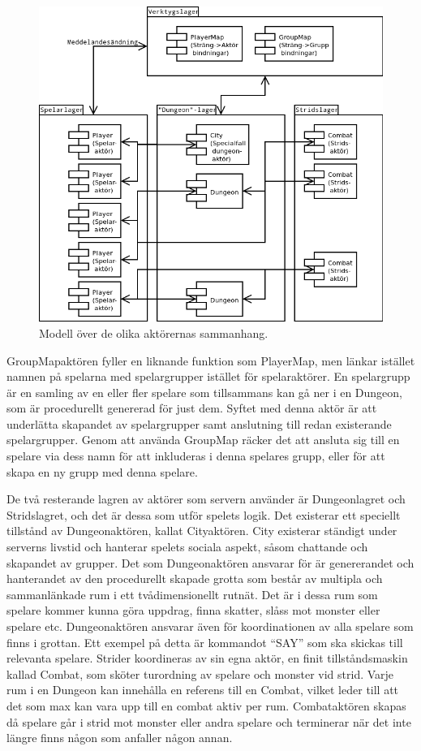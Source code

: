 \documentclass[a4paper]{article}
\begin{document}
\begin{figure}[hbt]
\centering
\includegraphics[width=1.0\textwidth]{serverActorModel2-2}
\caption{\label{fig:ServerActorModel}Modell över de olika aktörernas sammanhang.}
\end{figure}

GroupMapaktören fyller en liknande funktion som PlayerMap, men länkar istället namnen på spelarna med spelargrupper istället för spelaraktörer. 
En spelargrupp är en samling av en eller fler spelare som tillsammans kan gå ner i en Dungeon, som är procedurellt genererad för just dem. Syftet med 
denna aktör är att underlätta skapandet av spelargrupper samt anslutning till redan existerande spelargrupper. Genom att använda GroupMap räcker det att ansluta sig till en 
spelare via dess namn för att inkluderas i denna spelares grupp, eller för att skapa en ny grupp med denna spelare.

De två resterande lagren av aktörer som servern använder är Dungeonlagret och Stridslagret, och det är dessa som utför spelets logik. 
Det existerar ett speciellt tillstånd av Dungeonaktören, kallat Cityaktören. City existerar ständigt 
under serverns livstid och hanterar spelets sociala aspekt, såsom chattande och skapandet av grupper. 
Det som Dungeonaktören ansvarar för är genererandet och hanterandet av den procedurellt skapade 
grotta som består av multipla och sammanlänkade rum i ett tvådimensionellt rutnät. Det är i dessa rum som spelare kommer kunna göra uppdrag, 
finna skatter, slåss mot monster eller spelare etc. Dungeonaktören ansvarar även för koordinationen av alla spelare som finns i grottan. 
Ett exempel på detta är kommandot “SAY”  som ska skickas till relevanta spelare. 
Strider koordineras av sin egna aktör, en finit tillståndsmaskin kallad Combat, som sköter turordning av spelare och monster vid strid. Varje rum i en Dungeon kan innehålla en
referens till en Combat, vilket leder till att det som max kan vara upp till en combat aktiv per rum. Combataktören skapas då spelare går i strid mot monster eller andra spelare
och terminerar när det inte längre finns någon som anfaller någon annan.
\end{document}
